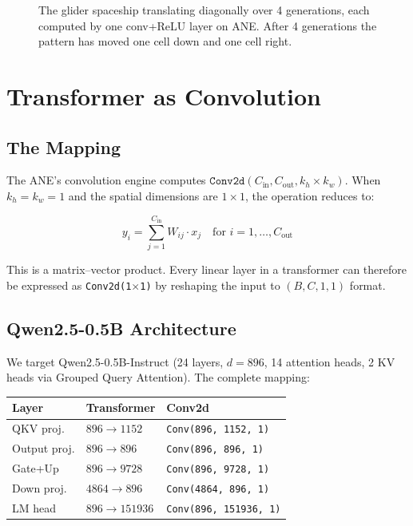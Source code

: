 \documentclass[11pt,twocolumn]{article}
\begin{document}
\begin{figure}[t]
\begin{tikzpicture}[scale=0.38, every node/.style={minimum size=0.38cm, inner sep=0pt}]
\end{tikzpicture}
\caption{The glider spaceship translating diagonally over 4
generations, each computed by one conv+ReLU layer on ANE. After 4
generations the pattern has moved one cell down and one cell right.}
\label{fig:gol_glider}
\end{figure}


\section{Transformer as Convolution}
\label{sec:transformer}

\subsection{The Mapping}

The ANE's convolution engine computes $\texttt{Conv2d}(C_\text{in},
C_\text{out}, k_h \times k_w)$. When $k_h = k_w = 1$ and the spatial
dimensions are $1 \times 1$, the operation reduces to:

\begin{equation}
y_i = \sum_{j=1}^{C_\text{in}} W_{ij} \cdot x_j \quad \text{for } i = 1, \ldots, C_\text{out}
\end{equation}

This is a matrix--vector product. Every linear layer in a transformer
can therefore be expressed as \texttt{Conv2d(1$\times$1)} by reshaping
the input to $(B, C, 1, 1)$ format.

\subsection{Qwen2.5-0.5B Architecture}

We target Qwen2.5-0.5B-Instruct (24 layers, $d=896$, 14 attention
heads, 2 KV heads via Grouped Query Attention). The complete mapping:

\begin{center}
\footnotesize
\begin{tabular}{lll}
\toprule
\textbf{Layer} & \textbf{Transformer} & \textbf{Conv2d} \\
\midrule
QKV proj. & $896 \to 1152$ & \texttt{Conv(896, 1152, 1)} \\
Output proj. & $896 \to 896$ & \texttt{Conv(896, 896, 1)} \\
Gate+Up & $896 \to 9728$ & \texttt{Conv(896, 9728, 1)} \\
Down proj. & $4864 \to 896$ & \texttt{Conv(4864, 896, 1)} \\
LM head & $896 \to 151936$ & \texttt{Conv(896, 151936, 1)} \\
\bottomrule
\end{tabular}
\end{center}
\end{document}
